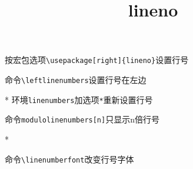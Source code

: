 \documentclass{article}
\title{lineno}
\date{}
\begin{document}
\maketitle

\linenumbers
按宏包选项\verb!\usepackage[right]{lineno}!设置行号

\lipsum[2]

\leftlinenumbers
命令\verb!\leftlinenumbers!设置行号在左边

\lipsum[2]


\begin{linenumbers}*
环境\verb!linenumbers!加选项\verb!*!重新设置行号

\lipsum[2]
\end{linenumbers}


命令\verb!modulolinenumbers[n]!只显示n倍行号

\begin{linenumbers}*
\modulolinenumbers[5]
\lipsum[2-3]
\end{linenumbers}


\renewcommand\linenumberfont{\normalfont\bfseries\small}

命令\verb!\linenumberfont!改变行号字体

\lipsum[2]


\renewcommand\linenumberfont{\normalfont\small}



\lipsum[2]

\end{document}

